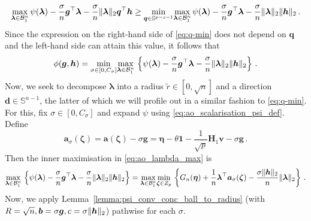 \documentclass{article}
\makeatletter
\theoremstyle{definition}
\newcommand{\vnorm}[1]{%
	\ensuremath{%
		\if@display
		\left\| #1 \right\|
		\else
		\| #1 \|
		\fi
	}%
}
\newcommand*{\bb}{\boldsymbol}
\def\bH {\bb{H}}
\def\bv{\bb{v}}
\def\bh{\bb{h}}
\def\bg{\bb{g}}
\def\bH{\bb{H}}
\def\blambda{\bb{\lambda}}
\makeatother
\begin{document}
\begin{bibunit}
\begin{equation}
\underset{\blambda \in \mathcal{B}_1^n}{\max} \, \psi(\blambda)
	-
	\frac{\sigma}{n}
	\bg^\top\blambda
	-
	\frac{\sigma}{n}
	\vnorm{\blambda}_2
	\bb{q}^\top\bh
	\geq \underset{\bb q \in \mathbb S^{p-s-1}}{\min} 	\underset{\blambda \in \mathcal{B}_1^n}{\max} \,
	\psi(\blambda)
	-
	\frac{\sigma}{n}
	\bg^\top\blambda
	-
	\frac{\sigma}{n}
	\vnorm{\blambda}_2
	\vnorm{\bh}_2 \,.
\end{equation}
Since the expression on the right-hand side of \eqref{eq:q-min} does not depend on $\bb q$ and the left-hand side can attain this value, it follows that
\begin{equation}
	\label{eq:ao_lambda_max}
	\phi(\bg,\bh)
	=
	\underset{\sigma\in[0,C_\sigma]}{\min}
	\underset{\blambda\in\mathcal B^n_1}{\max} \,
	\left\{
		\psi(\blambda)
		-
		\frac{\sigma}{n}
		\bg^\top\blambda
		-
		\frac{\sigma}{n}
		\vnorm{\blambda}_2
		\vnorm{\bh}_2
	\right\} \,.
\end{equation}
Now, we seek to decompose $\blambda$ into a radius $\tilde r \in [0, \sqrt n]$ and a direction $\bb d \in \mathbb S^{n -1}$, the latter of which we will profile out in a similar fashion to \eqref{eq:q-min}. 
For this, fix $\sigma\in[0,C_\sigma]$ and expand $\psi$ using \eqref{eq:ao_scalarisation_psi_def}. Define
\begin{equation}
	\label{eq:ao_scalarisation_A_sigma}
	\bb a_\sigma(\bb{\zeta})
	=
	\bb a (\bb \zeta)
	-
	\sigma\bg
	=
	\bb\eta
	-
	\theta\bb 1
	-
	\frac{1}{\sqrt p}
	\bH_1\bv
	-
	\sigma\bg \,.
\end{equation}
Then the inner maximisation in \eqref{eq:ao_lambda_max} is
\begin{equation}
	\label{eq:ao_scalarisation_lambda_min}
	\begin{aligned}
		\underset{\blambda\in\mathcal B^n_1}{\max} \,
		\left\{
			\psi(\blambda)
			-
			\frac{\sigma}{n}
			\bg^\top\blambda
			-
			\frac{\sigma}{n}
			\vnorm{\blambda}_2
			\vnorm{\bh}_2
		\right\}
		=
		\underset{\blambda\in\mathcal B^n_1}{\max}
		\underset{\bb{\zeta}\in Z_p}{\min} \,
		\left\{
			G_n(\bb\eta)
			+
			\frac{1}{n}
			\blambda^\top
			\bb a_\sigma(\bb{\zeta})
			-
			\frac{\sigma\vnorm{\bh}_2}{n}
			\vnorm{\blambda}_2
		\right\} \,.
	\end{aligned}
\end{equation}
Now, we apply Lemma~\ref{lemma:psi_conv_conc_ball_to_radius} (with $R=\sqrt n, \bb b=\sigma\bg, c=\sigma\vnorm{\bh}_2$) pathwise for each $\sigma$.

\end{bibunit}
\end{document}
